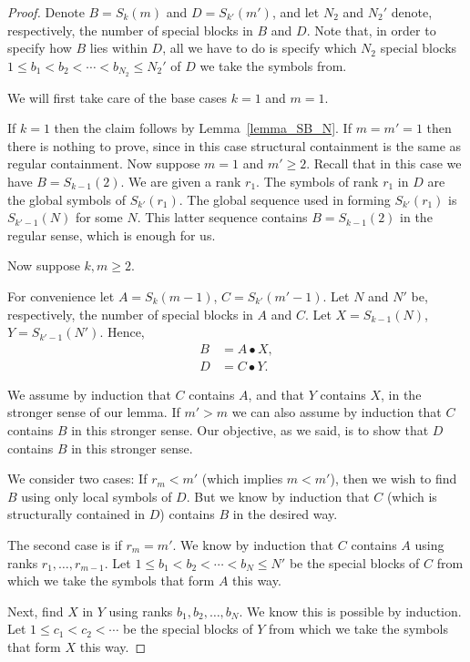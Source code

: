 \documentclass[11pt]{article}
\theoremstyle{definition}
\theoremstyle{remark}
\begin{document}
\begin{proof}
Denote $B = S_k(m)$ and $D= S_{k'}(m')$, and let $N_2$ and $N_2'$ denote, respectively, the number of special blocks in $B$ and $D$. Note that, in order to specify how $B$ lies within $D$, all we have to do is specify which $N_2$ special blocks $1\le b_1 < b_2 < \cdots < b_{N_2} \le N_2'$ of $D$ we take the symbols from.

We will first take care of the base cases $k = 1$ and $m = 1$.

If $k=1$ then the claim follows by Lemma~\ref{lemma_SB_N}. If $m = m'= 1$ then there is nothing to prove, since in this case structural containment is the same as regular containment. Now suppose $m=1$ and $m'\ge 2$. Recall that in this case we have $B = S_{k-1}(2)$. We are given a rank $r_1$. The symbols of rank $r_1$ in $D$ are the global symbols of $S_{k'}(r_1)$. The global sequence used in forming $S_{k'}(r_1)$ is $S_{k'-1}(N)$ for some $N$. This latter sequence contains $B = S_{k-1}(2)$ in the regular sense, which is enough for us.

Now suppose $k,m\ge 2$.

For convenience let $A = S_k(m-1)$, $C = S_{k'}(m'-1)$. Let $N$ and $N'$ be, respectively, the number of special blocks in $A$ and $C$. Let $X = S_{k-1}(N)$, $Y = S_{k'-1}(N')$. Hence,
\begin{align*}
B &= A \bullet X,\\
D &= C \bullet Y.
\end{align*}

We assume by induction that $C$ contains $A$, and that $Y$ contains $X$, in the stronger sense of our lemma. If $m'>m$ we can also assume by induction that $C$ contains $B$ in this stronger sense. Our objective, as we said, is to show that $D$ contains $B$ in this stronger sense.

We consider two cases: If $r_m < m'$ (which implies $m<m'$), then we wish to find $B$ using only local symbols of $D$. But we know by induction that $C$ (which is structurally contained in $D$) contains $B$ in the desired way.

The second case is if $r_m = m'$. We know by induction that $C$ contains $A$ using ranks $r_1, \ldots, r_{m-1}$. Let $1\le b_1 < b_2 < \cdots < b_{N}\le N'$ be the special blocks of $C$ from which we take the symbols that form $A$ this way.

Next, find $X$ in $Y$ using ranks $b_1, b_2, \ldots, b_N$. We know this is possible by induction. Let $1\le c_1 < c_2 < \cdots$ be the special blocks of $Y$ from which we take the symbols that form $X$ this way.


\end{proof}
\end{document}
